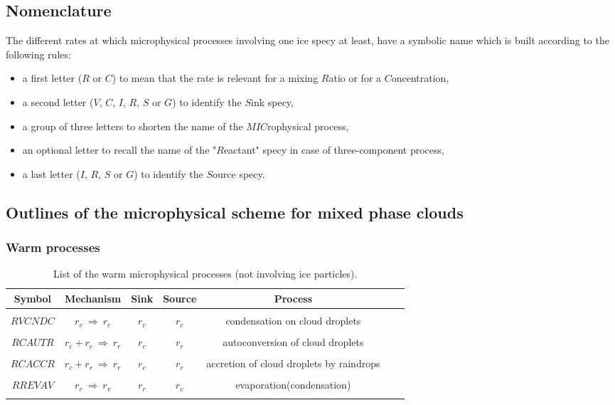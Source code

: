 %
\subsection{Nomenclature}
%

The different rates at which microphysical processes involving one ice specy
at least, have a symbolic name which is built according to the following rules:
\begin{itemize}
\item a first letter ($R$ or $C$) to mean that the rate is relevant for a
mixing $R$atio or for a $C$oncentration,
\item a second letter ($V$, $C$, $I$, $R$, $S$ or $G$) to identify the $S$ink
specy,
\item a group of three letters to shorten the name of the $MIC$rophysical process,
\item an optional letter to recall the name of the "$R$eactant" specy in case of
three-component process,
\item a last letter ($I$, $R$, $S$ or $G$) to identify the $S$ource specy.
\end{itemize}


%
\subsection{Outlines of the microphysical scheme for mixed phase clouds}
%

%
\subsubsection{Warm processes}
%
\begin{table}[!ht]
\caption{List of the warm microphysical processes (not involving ice particles).}
\begin{center}\label{table5}
\begin{tabular}{|c|c|c|c|c|c|c|}
\hline
Symbol & Mechanism & Sink & Source & Process \\
\hline \hline
 & & & & \\
$RVCNDC$ & $r_v\ \Longrightarrow \ r_c$ & $r_v$ & $r_c$ & condensation on cloud droplets \\
 & & & & \\
$RCAUTR$ & $r_c+r_c\ \Longrightarrow \ r_r$ & $r_c$ & $r_r$ & autoconversion of cloud droplets \\
 & & & & \\
$RCACCR$ & $r_c+r_r\ \Longrightarrow \ r_r$ & $r_c$ & $r_r$ & accretion of cloud droplets by raindrops \\
 & & & & \\
$RREVAV$ & $r_r\ \Longrightarrow \ r_v$ & $r_r$ & $r_v$ & evaporation(condensation) \\
 & & & & \\
\hline
\end{tabular}
\end{center}
\end{table}


